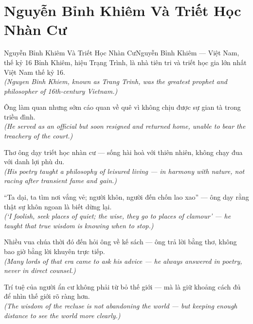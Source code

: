 \section{Nguyễn Bỉnh Khiêm Và Triết Học Nhàn Cư}
\begin{truyen}{Nguyễn Bỉnh Khiêm Và Triết Học Nhàn Cư}{Nguyễn Bỉnh Khiêm --- Việt Nam, thế kỷ 16}
 Bỉnh Khiêm, hiệu Trạng Trình, là nhà tiên tri và triết học gia lớn nhất Việt Nam thế kỷ 16.\\[4pt]
\textit{(Nguyen Binh Khiem, known as Trang Trinh, was the greatest prophet and philosopher of 16th-century Vietnam.)}

Ông làm quan nhưng sớm cáo quan về quê vì không chịu được sự gian tà trong triều đình.\\[4pt]
\textit{(He served as an official but soon resigned and returned home, unable to bear the treachery of the court.)}

Thơ ông dạy triết học nhàn cư --- sống hài hoà với thiên nhiên, không chạy đua với danh lợi phù du.\\[4pt]
\textit{(His poetry taught a philosophy of leisured living --- in harmony with nature, not racing after transient fame and gain.)}

``Ta dại, ta tìm nơi vắng vẻ; người khôn, người đến chốn lao xao'' --- ông dạy rằng thật sự khôn ngoan là biết dừng lại.\\[4pt]
\textit{(`I foolish, seek places of quiet; the wise, they go to places of clamour' --- he taught that true wisdom is knowing when to stop.)}

Nhiều vua chúa thời đó đến hỏi ông về kế sách --- ông trả lời bằng thơ, không bao giờ bằng lời khuyên trực tiếp.\\[4pt]
\textit{(Many lords of that era came to ask his advice --- he always answered in poetry, never in direct counsel.)}

\end{truyen}
\begin{baihoc}
  Trí tuệ của người ẩn cư không phải từ bỏ thế giới --- mà là giữ khoảng cách đủ để nhìn thế giới rõ ràng hơn.\\[4pt]
  \textit{(The wisdom of the recluse is not abandoning the world --- but keeping enough distance to see the world more clearly.)}
\end{baihoc}
